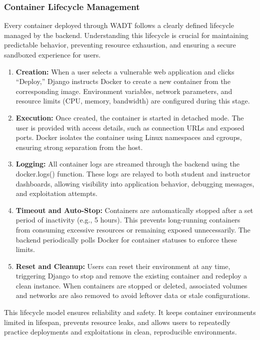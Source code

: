 \documentclass[12pt]{article}
\begin{document}
\subsubsection{Container Lifecycle Management}
Every container deployed through WADT follows a clearly defined lifecycle managed by the backend. Understanding this lifecycle is crucial for maintaining predictable behavior, preventing resource exhaustion, and ensuring a secure sandboxed experience for users.

\begin{enumerate}
    \item \textbf{Creation:} When a user selects a vulnerable web application and clicks “Deploy,” Django instructs Docker to create a new container from the corresponding image. Environment variables, network parameters, and resource limits (CPU, memory, bandwidth) are configured during this stage.
    \item \textbf{Execution:} Once created, the container is started in detached mode. The user is provided with access details, such as connection URLs and exposed ports. Docker isolates the container using Linux namespaces and cgroups, ensuring strong separation from the host.
    \item \textbf{Logging:} All container logs are streamed through the backend using the docker.logs() function. These logs are relayed to both student and instructor dashboards, allowing visibility into application behavior, debugging messages, and exploitation attempts.
    \item \textbf{Timeout and Auto-Stop:} Containers are automatically stopped after a set period of inactivity (e.g., 5 hours). This prevents long-running containers from consuming excessive resources or remaining exposed unnecessarily. The backend periodically polls Docker for container statuses to enforce these limits.
    \item \textbf{Reset and Cleanup:} Users can reset their environment at any time, triggering Django to stop and remove the existing container and redeploy a clean instance. When containers are stopped or deleted, associated volumes and networks are also removed to avoid leftover data or stale configurations.
\end{enumerate}

This lifecycle model ensures reliability and safety. It keeps container environments limited in lifespan, prevents resource leaks, and allows users to repeatedly practice deployments and exploitations in clean, reproducible environments.
\end{document}
